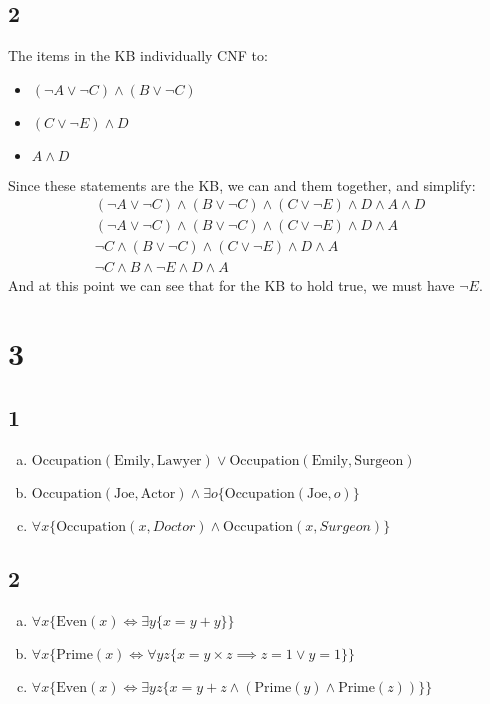 \subsection*{2}
The items in the KB individually CNF to:
\begin{itemize}
    \item   $(\neg A \vee  \neg C) \wedge  (B \vee  \neg C)$
    \item   $(C \vee  \neg E) \wedge  D$
    \item   $A \wedge D$
\end{itemize}

Since these statements are the KB, we can and them together, and simplify:
\begin{align*}
(\neg A \vee  \neg C) \wedge  (B \vee  \neg C) \wedge (C \vee  \neg E) \wedge  D \wedge A \wedge D
\\
(\neg A \vee  \neg C) \wedge  (B \vee  \neg C) \wedge (C \vee  \neg E) \wedge  D \wedge A
\\
\neg C \wedge  (B \vee  \neg C) \wedge (C \vee  \neg E) \wedge  D \wedge A
\\
\neg C \wedge  B \wedge \neg E \wedge  D \wedge A
\end{align*}
And at this point we can see that for the KB to hold true, we must have $\neg E$.


\section*{3}
\subsection*{1}
\begin{enumerate}[a.]
    \item $\text{Occupation}(\text{Emily}, \text{Lawyer}) \vee \text{Occupation}(\text{Emily}, \text{Surgeon})$
    \item $\text{Occupation}(\text{Joe}, \text{Actor}) \wedge \exists o \{\text{Occupation}(\text{Joe}, o)\}$
    \item $\forall x \{\text{Occupation}(x, Doctor) \wedge \text{Occupation}(x, Surgeon)\}$
\end{enumerate}

\subsection*{2}
\begin{enumerate}[a.]
    \item $\forall x \{ \text{Even}(x) \Leftrightarrow \exists y \{ x = y + y\}\}$
    \item $\forall x \{ \text{Prime}(x) \Leftrightarrow \forall yz \{ x = y \times z \implies z = 1 \vee y = 1\}\}$
    \item $\forall x \{ \text{Even}(x) \Leftrightarrow \exists yz \{ x = y + z \wedge (\text{Prime}(y) \wedge \text{Prime}(z))\}\}$
\end{enumerate}

